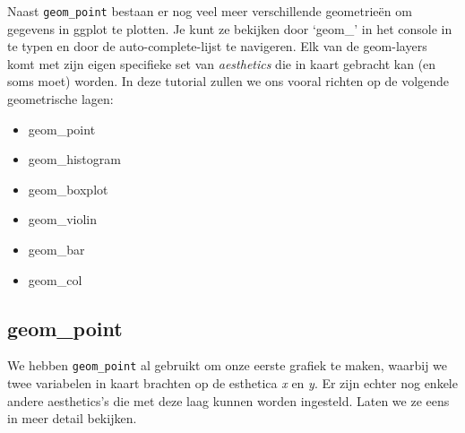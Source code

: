 \documentclass[]{tufte-book}
\providecommand{\tightlist}{%
  \setlength{\itemsep}{0pt}\setlength{\parskip}{0pt}}
\begin{document}
Naast \texttt{geom\_point} bestaan er nog veel meer verschillende geometrieën om gegevens in ggplot te plotten. Je kunt ze bekijken door `geom\_' in het console in te typen en door de auto-complete-lijst te navigeren. Elk van de geom-layers komt met zijn eigen specifieke set van \emph{aesthetics} die in kaart gebracht kan (en soms moet) worden. In deze tutorial zullen we ons vooral richten op de volgende geometrische lagen:

\begin{itemize}
\tightlist
\item
  geom\_point
\item
  geom\_histogram
\item
  geom\_boxplot
\item
  geom\_violin
\item
  geom\_bar
\item
  geom\_col
\end{itemize}

\hypertarget{geom_point}{%
\subsection{geom\_point}\label{geom_point}}

We hebben \texttt{geom\_point} al gebruikt om onze eerste grafiek te maken, waarbij we twee variabelen in kaart brachten op de esthetica \emph{x} en \emph{y}. Er zijn echter nog enkele andere aesthetics's die met deze laag kunnen worden ingesteld. Laten we ze eens in meer detail bekijken.
\end{document}
